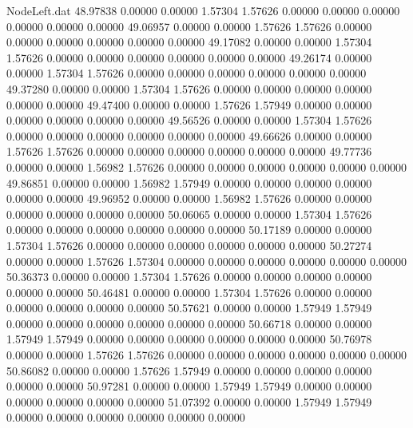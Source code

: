\begin{filecontents}{NodeLeft.dat}
  48.97838    0.00000    0.00000     1.57304    1.57626    0.00000    0.00000    0.00000    0.00000    0.00000    0.00000
  49.06957    0.00000    0.00000     1.57626    1.57626    0.00000    0.00000    0.00000    0.00000    0.00000    0.00000
  49.17082    0.00000    0.00000     1.57304    1.57626    0.00000    0.00000    0.00000    0.00000    0.00000    0.00000
  49.26174    0.00000    0.00000     1.57304    1.57626    0.00000    0.00000    0.00000    0.00000    0.00000    0.00000
  49.37280    0.00000    0.00000     1.57304    1.57626    0.00000    0.00000    0.00000    0.00000    0.00000    0.00000
  49.47400    0.00000    0.00000     1.57626    1.57949    0.00000    0.00000    0.00000    0.00000    0.00000    0.00000
  49.56526    0.00000    0.00000     1.57304    1.57626    0.00000    0.00000    0.00000    0.00000    0.00000    0.00000
  49.66626    0.00000    0.00000     1.57626    1.57626    0.00000    0.00000    0.00000    0.00000    0.00000    0.00000
  49.77736    0.00000    0.00000     1.56982    1.57626    0.00000    0.00000    0.00000    0.00000    0.00000    0.00000
  49.86851    0.00000    0.00000     1.56982    1.57949    0.00000    0.00000    0.00000    0.00000    0.00000    0.00000
  49.96952    0.00000    0.00000     1.56982    1.57626    0.00000    0.00000    0.00000    0.00000    0.00000    0.00000
  50.06065    0.00000    0.00000     1.57304    1.57626    0.00000    0.00000    0.00000    0.00000    0.00000    0.00000
  50.17189    0.00000    0.00000     1.57304    1.57626    0.00000    0.00000    0.00000    0.00000    0.00000    0.00000
  50.27274    0.00000    0.00000     1.57626    1.57304    0.00000    0.00000    0.00000    0.00000    0.00000    0.00000
  50.36373    0.00000    0.00000     1.57304    1.57626    0.00000    0.00000    0.00000    0.00000    0.00000    0.00000
  50.46481    0.00000    0.00000     1.57304    1.57626    0.00000    0.00000    0.00000    0.00000    0.00000    0.00000
  50.57621    0.00000    0.00000     1.57949    1.57949    0.00000    0.00000    0.00000    0.00000    0.00000    0.00000
  50.66718    0.00000    0.00000     1.57949    1.57949    0.00000    0.00000    0.00000    0.00000    0.00000    0.00000
  50.76978    0.00000    0.00000     1.57626    1.57626    0.00000    0.00000    0.00000    0.00000    0.00000    0.00000
  50.86082    0.00000    0.00000     1.57626    1.57949    0.00000    0.00000    0.00000    0.00000    0.00000    0.00000
  50.97281    0.00000    0.00000     1.57949    1.57949    0.00000    0.00000    0.00000    0.00000    0.00000    0.00000
  51.07392    0.00000    0.00000     1.57949    1.57949    0.00000    0.00000    0.00000    0.00000    0.00000    0.00000

\end{filecontents}

